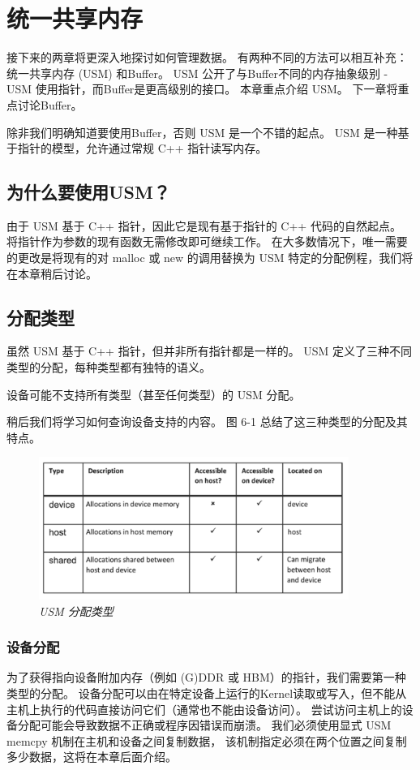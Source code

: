 \section{统一共享内存}
接下来的两章将更深入地探讨如何管理数据。 有两种不同的方法可以相互补充：统一共享内存 (USM) 和Buffer。 
USM 公开了与Buffer不同的内存抽象级别 - USM 使用指针，而Buffer是更高级别的接口。 
本章重点介绍 USM。 下一章将重点讨论Buffer。

除非我们明确知道要使用Buffer，否则 USM 是一个不错的起点。 
USM 是一种基于指针的模型，允许通过常规 C++ 指针读写内存。

\subsection{为什么要使用USM？}
由于 USM 基于 C++ 指针，因此它是现有基于指针的 C++ 代码的自然起点。 
将指针作为参数的现有函数无需修改即可继续工作。 
在大多数情况下，唯一需要的更改是将现有的对 malloc 或 new 的调用替换为 USM 特定的分配例程，我们将在本章稍后讨论。

\subsection{分配类型}
虽然 USM 基于 C++ 指针，但并非所有指针都是一样的。 USM 定义了三种不同类型的分配，每种类型都有独特的语义。

设备可能不支持所有类型（甚至任何类型）的 USM 分配。

稍后我们将学习如何查询设备支持的内容。 图 6-1 总结了这三种类型的分配及其特点。

\begin{figure}[H]
	\centering
	\includegraphics[width=0.9\textwidth]{figs/F6.1.png}
	\caption{\textit{USM 分配类型}}
\end{figure}

\subsubsection{设备分配}
为了获得指向设备附加内存（例如 (G)DDR 或 HBM）的指针，我们需要第一种类型的分配。 
设备分配可以由在特定设备上运行的Kernel读取或写入，但不能从主机上执行的代码直接访问它们（通常也不能由设备访问）。 
尝试访问主机上的设备分配可能会导致数据不正确或程序因错误而崩溃。 
我们必须使用显式 USM memcpy 机制在主机和设备之间复制数据，
该机制指定必须在两个位置之间复制多少数据，这将在本章后面介绍。

